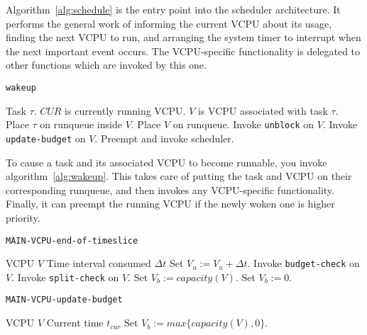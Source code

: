 \documentclass{article}
\begin{document}
Algorithm~\ref{alg:schedule} is the entry point into the scheduler
architecture.  It performs the general work of informing the current
VCPU about its usage, finding the next VCPU to run, and arranging the
system timer to interrupt when the next important event occurs.  The
VCPU-specific functionality is delegated to other functions which are
invoked by this one.

\begin{algorithm}
  \caption {\tt wakeup}\label{alg:wakeup}
  \begin{algorithmic}[1]
    \REQUIRE Task $\tau$.
    \REQUIRE $CUR$ is currently running VCPU.
    \REQUIRE $V$ is VCPU associated with task $\tau$.
    \STATE Place $\tau$ on runqueue inside $V$.
    \STATE Place $V$ on runqueue.
    \STATE Invoke {\tt unblock} on $V$.
    \STATE Invoke {\tt update-budget} on $V$.
    \STATE Preempt and invoke scheduler.
    \ENDIF
  \end{algorithmic}
\end{algorithm}

To cause a task and its associated VCPU to become runnable, you invoke
algorithm~\ref{alg:wakeup}.  This takes care of putting the task and
VCPU on their corresponding runqueue, and then invokes any
VCPU-specific functionality.  Finally, it can preempt the running VCPU
if the newly woken one is higher priority.

\begin{algorithm}
  \caption{\tt MAIN-VCPU-end-of-timeslice}\label{alg:vcpu_eot}
  \begin{algorithmic}[1]
    \REQUIRE VCPU $V$
    \REQUIRE Time interval consumed $\Delta t$
    \STATE Set $V_u:=V_u+\Delta t$.
    \STATE Invoke {\tt budget-check} on $V$.
    \STATE Invoke {\tt split-check} on $V$.
    \ENDIF
    \STATE Set $V_b:=capacity(V)$.
    \ELSE
    \STATE Set $V_b:=0$.
    \ENDIF
  \end{algorithmic}
\end{algorithm}

\begin{algorithm}
  \caption{\tt MAIN-VCPU-update-budget}\label{alg:vcpu_upbudg}
  \begin{algorithmic}[1]
    \REQUIRE VCPU $V$
    \REQUIRE Current time $t_{cur}$
    \STATE Set $V_b:=max\{capacity(V), 0\}$.
  \end{algorithmic}
\end{algorithm}
\end{document}
